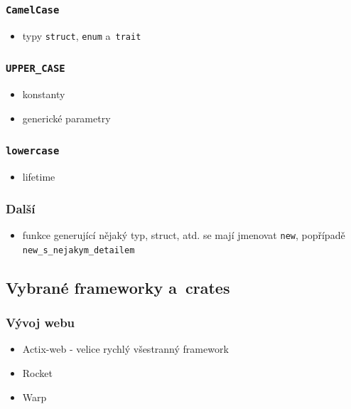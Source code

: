 \documentclass[a4paper, 12pt, twoside]{article} %
\newcommand{\rust}[1]{\texttt{#1}}
\begin{document}
		\subsubsection*{\texttt{CamelCase}}
			\begin{itemize}
				\item typy \texttt{struct}, \texttt{enum} a~\texttt{trait}
			\end{itemize}


		\subsubsection*{\texttt{UPPER\_CASE}}
			\begin{itemize}
				\item konstanty
				\item generické parametry
			\end{itemize}


		\subsubsection*{\texttt{lowercase}}
			\begin{itemize}
				\item lifetime
			\end{itemize}


		\subsubsection*{Další}
			\begin{itemize}
				\item funkce generující nějaký typ, struct, atd. se mají jmenovat \rust{new}, popřípadě \rust{new_s_nejakym_detailem}
				
				\hypertarget{_}{}
			\end{itemize}\cite{convention}


	\subsection{Vybrané frameworky a~crates}
		\subsubsection*{Vývoj webu}
			\begin{itemize} 
				\item Actix-web - velice rychlý všestranný framework
				\item Rocket
				\item Warp
			\end{itemize}
\end{document}
